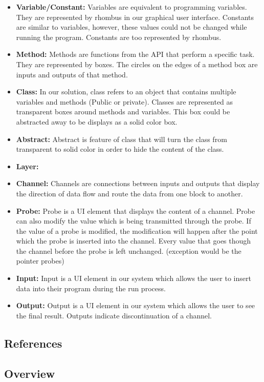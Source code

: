 \documentclass[journal,10pt,onecolumn,compsoc]{IEEEtran} \usepackage[margin=1.0in]{geometry} \usepackage{pdfpages} \usepackage{graphicx}
\begin{document}
\begin{itemize}
	\item \textbf{Variable/Constant:}
		Variables are equivalent to programming variables. They are represented by rhombus in our graphical user interface.
		Constants are similar to  variables, however, these values could not be changed while running the program.
		Constants are too represented by rhombus.
	\item \textbf{Method:}
		Methods are functions from the API that perform a specific task. They are represented by boxes.
		The circles on the edges of a method box are inputs and outputs of that method.
	\item \textbf{Class:} 
		In our solution, class refers to an object that contains multiple variables and methods (Public or private).
		Classes are represented as transparent boxes around methods and variables. This box could be abstracted away to be displays as a solid color box.
	\item \textbf{Abstract:}
		Abstract is feature of class that will turn the class from transparent to solid color in order to hide the content of the class.
	\item \textbf{Layer:} 
	\item \textbf{Channel:}
		 Channels are connections between inputs and outputs that display the direction of data flow and route the data from one block to another. 
	\item \textbf{Probe:}
		Probe is a UI element that displays the content of a channel.
		Probe can also modify the value which is being transmitted through the probe.
		If the value of a probe is modified, the modification will happen after the point which the probe is inserted into the channel.
		Every value that goes though the channel before the probe is left unchanged. (exception would be the pointer probes)
	\item \textbf{Input:}
		Input is a UI element in our system which allows the user to insert data into their program during the run process.
	\item \textbf{Output:}
		Output is a UI element in our system which allows the user to see the final result. Outputs indicate discontinuation of a channel.
\end{itemize}
\subsection{References}
\subsection{Overview}
\end{document}
